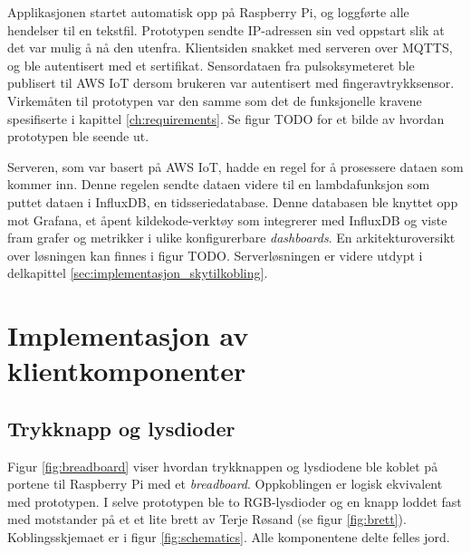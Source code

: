 Applikasjonen startet automatisk opp på Raspberry Pi, og loggførte alle hendelser til en tekstfil.
Prototypen sendte IP-adressen sin ved oppstart slik at det var mulig å nå den utenfra.
Klientsiden snakket med serveren over MQTTS, og ble autentisert med et sertifikat. Sensordataen fra pulsoksymeteret ble publisert til
AWS IoT dersom brukeren var autentisert med fingeravtrykksensor. Virkemåten til prototypen var den samme som det de funksjonelle
kravene spesifiserte i kapittel \ref{ch:requirements}. Se figur TODO for et bilde av hvordan prototypen ble seende ut.

Serveren, som var basert på AWS IoT, hadde en
regel for å prosessere dataen som kommer inn. Denne regelen sendte dataen videre til en lambdafunksjon som puttet dataen
i InfluxDB, en tidsseriedatabase. Denne databasen ble knyttet opp mot Grafana, et åpent kildekode-verktøy som integrerer
med InfluxDB og viste fram grafer og metrikker i ulike konfigurerbare \textit{dashboards}. En arkitekturoversikt over løsningen
kan finnes i figur TODO. Serverløsningen er videre utdypt i delkapittel \ref{sec:implementasjon_skytilkobling}.

\section{Implementasjon av klientkomponenter}

\subsection{Trykknapp og lysdioder}
Figur \ref{fig:breadboard} viser hvordan trykknappen og lysdiodene ble koblet på
portene til Raspberry Pi med et \textit{breadboard}. Oppkoblingen er logisk ekvivalent med prototypen.
I selve prototypen ble to RGB-lysdioder og en knapp loddet fast med motstander på et et lite brett av Terje Røsand (se figur \ref{fig:brett}).
Koblingsskjemaet er i figur \ref{fig:schematics}. Alle komponentene delte felles jord.


